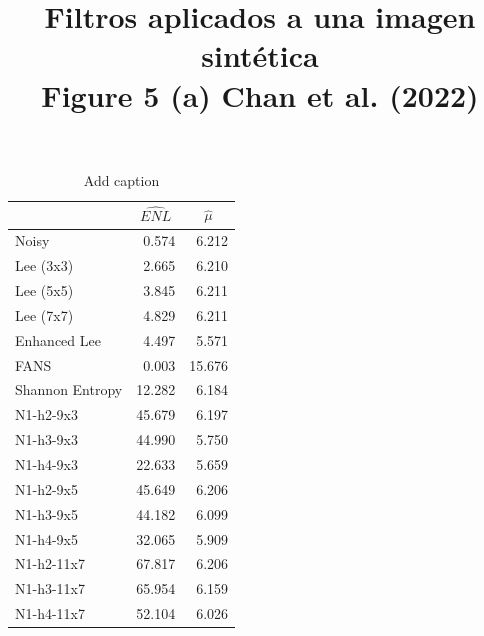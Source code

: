 \documentclass[10pt,a4paper]{article}
\title{Filtros aplicados a una imagen sintética\\ Figure 5 (a) Chan et al. (2022)}
\date{}
\begin{document}
\maketitle


\begin{table}[htbp]
	\centering
	\caption{Add caption}
	\begin{tabular}{lrr}
		& \multicolumn{1}{c}{$\widehat{ENL}$} & \multicolumn{1}{c}{$\hat{\mu}$ } \\
		\midrule
		Noisy  & 0.574 & 6.212 \\
		Lee (3x3) & 2.665 & 6.210 \\
		Lee (5x5) & 3.845 & 6.211 \\
		Lee (7x7) & 4.829 & 6.211 \\
		Enhanced Lee & 4.497 & 5.571 \\
		FANS  & 0.003 & 15.676 \\
		Shannon Entropy  & 12.282 & 6.184 \\
		N1-h2-9x3 & 45.679 & 6.197 \\
		N1-h3-9x3 & 44.990 & 5.750 \\
		N1-h4-9x3 & 22.633 & 5.659 \\
		N1-h2-9x5 & 45.649 & 6.206 \\
		N1-h3-9x5 & 44.182 & 6.099 \\
		N1-h4-9x5 & 32.065 & 5.909 \\
		N1-h2-11x7 & 67.817 & 6.206 \\
		N1-h3-11x7 & 65.954 & 6.159 \\
		N1-h4-11x7 & 52.104 & 6.026 \\
	\end{tabular}%
	\label{tab:addlabel}%
\end{table}%



\newpage
\end{document}
